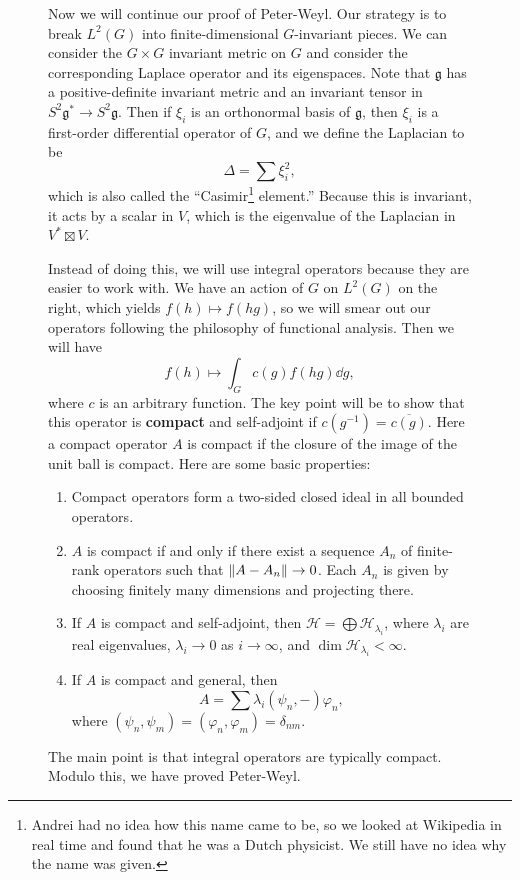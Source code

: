 \documentclass[leqno, openany]{memoir}
\theoremstyle{definition}
\theoremstyle{remark}
\theoremstyle{plain}
\theoremstyle{definition}
\theoremstyle{remark}
\newcommand{\mc}[1]{\mathcal{#1}}
\newcommand{\mf}[1]{\mathfrak{#1}}
\newcommand{\ol}[1]{\overline{#1}}
\begin{document}
\begin{figure}[H]
Now we will continue our proof of Peter-Weyl. Our strategy is to break $L^2(G)$
into finite-dimensional $G$-invariant pieces. We can consider the $G \times G$
invariant metric on $G$ and consider the corresponding Laplace operator and its
eigenspaces. Note that $\mf{g}$ has a positive-definite invariant metric and an
invariant tensor in $S^2 \mf{g}^* \to S^2 \mf{g}$. Then if $\xi_i$ is an
orthonormal basis of $\mf{g}$, then $\mf{\xi}_i$ is a first-order differential
operator of $G$, and we define the Laplacian to be \[ \Delta = \sum \xi_i^2, \]
which is also called the ``Casimir\footnote{Andrei had no idea how this name
came to be, so we looked at Wikipedia in real time and found that he was a
Dutch physicist. We still have no idea why the name was given.} element.''
Because this is invariant, it acts by a scalar in $V$, which is the eigenvalue
of the Laplacian in $V^* \boxtimes V$.

Instead of doing this, we will use integral operators because they are easier
to work with. We have an action of $G$ on $L^2(G)$ on the right, which yields
$f(h) \mapsto f(hg)$, so we will smear out our operators following the
philosophy of functional analysis. Then we will have \[ f(h) \mapsto \int_G
c(g) f(hg) \dd{g}, \] where $c$ is an arbitrary function. The key point will be
to show that this operator is \textbf{compact} and self-adjoint if $c(g^{-1}) =
\ol{c(g)}$. Here a compact operator $A$ is compact if the closure of the image
of the unit ball is compact. Here are some basic properties: \begin{enumerate}
    \item Compact operators form a two-sided closed ideal in all bounded
        operators.  \item $A$ is compact if and only if there exist a sequence
        $A_n$ of finite-rank operators such that $\norm{A - A_n} \to 0$. Each
        $A_n$ is given by choosing finitely many dimensions and projecting
        there.  \item If $A$ is compact and self-adjoint, then $\mc{H} =
        \bigoplus \mc{H}_{\lambda_i}$, where $\lambda_i$ are real eigenvalues,
        $\lambda_i \to 0$ as $i \to \infty$, and $\dim \mc{H}_{\lambda_i} <
        \infty$.  \item If $A$ is compact and general, then \[ A = \sum
    \lambda_i (\psi_n, -) \varphi_n, \] where $(\psi_n, \psi_m) = (\varphi_n,
    \varphi_m) =  \delta_{nm}$.  \end{enumerate} The main point is that
    integral operators are typically compact. Modulo this, we have proved
    Peter-Weyl.


\end{figure}
\end{document}
